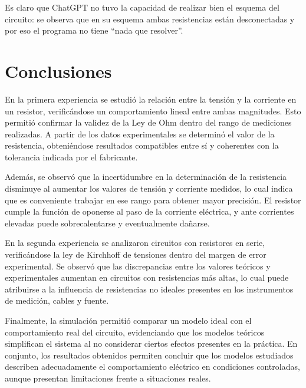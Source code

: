 \documentclass[12pt]{article}
\begin{document}
Es claro que ChatGPT no tuvo la capacidad de realizar bien el esquema del circuito: se observa que en su esquema  ambas resistencias están desconectadas y por eso el programa no tiene ``nada
que resolver''.

\section{Conclusiones}
En la primera experiencia se estudió la relación entre la tensión y la corriente en un resistor, verificándose un comportamiento lineal entre ambas magnitudes. 
Esto permitió confirmar la validez de la Ley de Ohm dentro del rango de mediciones realizadas. A partir de los datos experimentales se determinó el valor de la resistencia, 
obteniéndose resultados compatibles entre sí y coherentes con la tolerancia indicada por el fabricante.

Además, se observó que la incertidumbre en la determinación de la resistencia disminuye al aumentar los valores de tensión y corriente medidos, lo cual indica 
que es conveniente trabajar en ese rango para obtener mayor precisión. El resistor cumple la función de oponerse al paso de la corriente eléctrica, y ante corrientes elevadas
puede sobrecalentarse y eventualmente dañarse.

En la segunda experiencia se analizaron circuitos con resistores en serie, verificándose la ley de Kirchhoff de tensiones dentro del margen de error experimental. 
Se observó que las discrepancias entre los valores teóricos y experimentales aumentan en circuitos con resistencias más altas, 
lo cual puede atribuirse a la influencia de resistencias no ideales presentes en los instrumentos de medición, cables y fuente.

Finalmente, la simulación permitió comparar un modelo ideal con el comportamiento real del circuito, evidenciando que los modelos teóricos simplifican 
el sistema al no considerar ciertos efectos presentes en la práctica. En conjunto, los resultados obtenidos permiten concluir que los modelos estudiados 
describen adecuadamente el comportamiento eléctrico en condiciones controladas, aunque presentan limitaciones frente a situaciones reales.
\end{document}

